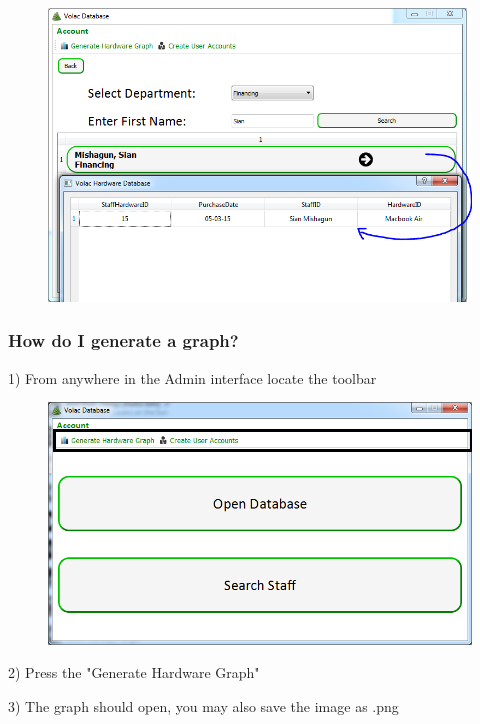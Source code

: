 \begin{figure}[H]
    \includegraphics[width=\textwidth]{./Manual/Images/searchdep4.png}
\end{figure}

\subsubsection{How do I generate a graph?}

1) From anywhere in the Admin interface locate the toolbar

\begin{figure}[H]
    \includegraphics[width=\textwidth]{./Manual/Images/graph1.png}
\end{figure}

2) Press the "Generate Hardware Graph"

3) The graph should open, you may also save the image as .png

